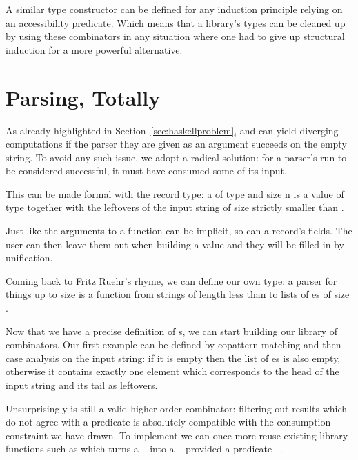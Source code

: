   A similar \BOX{}
type constructor can be defined for any induction principle relying
on an accessibility predicate. Which means that a library's types
can be cleaned up by using these combinators in any situation where
one had to give up structural induction for a more powerful alternative.

\section{Parsing, Totally}

As already highlighted in Section~\ref{sec:haskellproblem}, 
and  can yield diverging computations if the parser they are
given as an argument succeeds on the empty string. To avoid any such
issue, we adopt a radical solution: for a parser's run to be considered
successful, it must have consumed some of its input.

This can be made formal with the  record type: a 
of type  and size {n} is a value of type  together with the
leftovers of the input string of size strictly smaller than .


 Just like the arguments to a function can be
implicit, so can a record's fields. The user can then leave them out
when building a value and they will be filled in by unification.

\medskip{}

Coming back to Fritz Ruehr's rhyme, we can define our own 
type: a parser for things up to size  is a function from strings
of length  less than  to lists of es of size .


Now that we have a precise definition of s, we can start
building our library of combinators. Our first example 
can be defined by copattern-matching and then case analysis on the
input string: if it is empty then the list of es is also
empty, otherwise it contains exactly one element which corresponds to
the head of the input string and its tail as leftovers.


Unsurprisingly  is still a valid higher-order combinator:
filtering out results which do not agree with a predicate is absolutely
compatible with the consumption constraint we have drawn. To implement
 we can once more reuse existing library functions such as
 which turns a \mbox{ } into a \mbox{ }
provided a predicate \mbox{   }.

